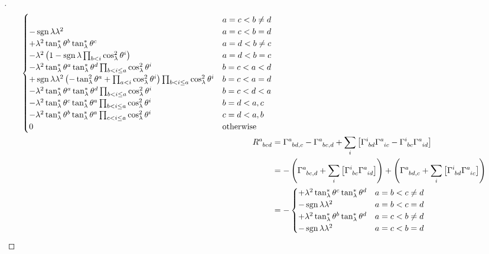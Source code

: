 \documentclass[../main.tex]{subfiles}
\begin{document}
\begin{proof}[]
\begin{align*}
\begin{cases}
&\text{$a=c<b\ne d$}\\
-\sign{\lambda}\lambda^2
&\text{$a=c<b=d$}\\
+\lambda^2\tan_\lambda^\ast\tensor{\theta}{^b}\tan_\lambda^\ast\tensor{\theta}{^c}
&\text{$a=d<b\ne c$}\\
-\lambda^2
\left(
1-\sign{\lambda}\prod_{b<i}\cos_\lambda^2\tensor{\theta}{^i}
\right)
&\text{$a=d<b=c$}\\
-\lambda^2\tan_\lambda^\ast\tensor{\theta}{^a}\tan_\lambda^\ast\tensor{\theta}{^d}\prod_{b<i\le a}\cos_\lambda^2\tensor{\theta}{^i}
&\text{$b=c<a<d$}\\
+\sign{\lambda}\lambda^2
\left(
-\tan_\lambda^2\tensor{\theta}{^a}
+\prod_{a<i}\cos_\lambda^2\tensor{\theta}{^i}
\right)
\prod_{b<i\le a}{\cos_\lambda^2\tensor{\theta}{^i}}
&\text{$b=c<a=d$}\\
-\lambda^2\tan_\lambda^\ast\tensor{\theta}{^a}\tan_\lambda^\ast\tensor{\theta}{^d}\prod_{b<i\le a}{\cos_\lambda^2\tensor{\theta}{^i}}
&\text{$b=c<d<a$}\\
-\lambda^2\tan_\lambda^\ast\tensor{\theta}{^c}\tan_\lambda^\ast\tensor{\theta}{^a}\prod_{b<i\le a}\cos_\lambda^2\tensor{\theta}{^i}
&\text{$b=d<a,c$}\\
-\lambda^2\tan_\lambda^\ast\tensor{\theta}{^b}\tan_\lambda^\ast\tensor{\theta}{^a}\prod_{c<i\le a}\cos_\lambda^2\tensor{\theta}{^i}
&\text{$c=d<a,b$}\\
0&\text{otherwise}\\
\end{cases}\\
\tensor{R}{^a_b_c_d}
&=
\tensor{\Gamma}{^a_b_d_{,c}}
-\tensor{\Gamma}{^a_b_c_{,d}}
+\sum_{i}\left[\tensor{\Gamma}{^i_b_d}\tensor{\Gamma}{^a_i_c}-\tensor{\Gamma}{^i_b_c}\tensor{\Gamma}{^a_i_d}\right]
\\
&=
-\left(
\tensor{\Gamma}{^a_b_c_{,d}}
+\sum_{i}\left[\tensor{\Gamma}{^i_b_c}\tensor{\Gamma}{^a_i_d}\right]
\right)
+\left(
\tensor{\Gamma}{^a_b_d_{,c}}
+\sum_{i}\left[\tensor{\Gamma}{^i_b_d}\tensor{\Gamma}{^a_i_c}\right]
\right)\\
&=-
\begin{cases}
+\lambda^2\tan_\lambda^\ast\tensor{\theta}{^c}\tan_\lambda^\ast\tensor{\theta}{^d}
&\text{$a=b<c\ne d$}\\
-\sign{\lambda}\lambda^2
&\text{$a=b<c=d$}\\
+\lambda^2\tan_\lambda^\ast\tensor{\theta}{^b}\tan_\lambda^\ast\tensor{\theta}{^d}
&\text{$a=c<b\ne d$}\\
-\sign{\lambda}\lambda^2
&\text{$a=c<b=d$}\\

\end{cases}
\end{align*}
\end{proof}
\end{document}
